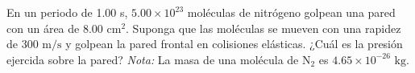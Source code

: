 \item En un periodo de 1.00 s, $5.00 \times 10^{23}$ moléculas de nitrógeno golpean una pared con un área de $8.00\text{ cm}^2$. Suponga que las moléculas se mueven con una rapidez de $300\text{ m/s}$ y golpean la pared frontal en colisiones elásticas. ¿Cuál es la presión ejercida sobre la pared? \textit{Nota:} La masa de una molécula de $\text{N}_2$ es $4.65 \times 10^{-26}\text{ kg}$.
